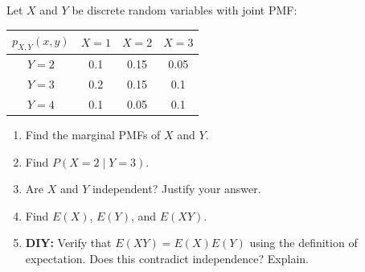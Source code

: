 \begin{exercise}
Let $X$ and $Y$ be discrete random variables with joint PMF:

\begin{center}
\renewcommand{\arraystretch}{1.5}
\begin{tabular}{c|ccc}
$p_{X,Y}(x,y)$ & $X=1$ & $X=2$ & $X=3$ \\ \hline
$Y=2$ & 0.1 & 0.15 & 0.05 \\
$Y=3$ & 0.2 & 0.15 & 0.1 \\
$Y=4$ & 0.1 & 0.05 & 0.1 \\
\end{tabular}
\end{center}

\begin{enumerate}[label=(\alph*)]
    \item Find the marginal PMFs of $X$ and $Y$.
    \item Find $P(X = 2 \mid Y = 3)$.
    \item Are $X$ and $Y$ independent? Justify your answer.
    \item Find $E(X)$, $E(Y)$, and $E(XY)$.
    \item \textbf{DIY:} Verify that $E(XY) = E(X)E(Y)$ using the definition of expectation. Does this contradict independence? Explain.
\end{enumerate}
\end{exercise}

